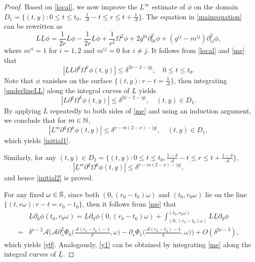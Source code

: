 \documentclass[10pt,a4paper]{amsart}
\begin{document}
\begin{proof}
Based on \eqref{local}, we now improve the $L^\infty$ estimate of $\phi$ on the domain $D_1=\{(t,y): 0\le t \le t_0,$
$\frac{1}{\mathcal A} - t\le r \le t+\frac{ 1}{\mathcal A}\}$.
The equation in \eqref{mainequation} can be rewritten as
\begin{equation}\label{me}
L\underline{L}\phi
= \frac{1}{2r}L\phi
- \frac{1}{2r}\underline{L}\phi
+ \frac{1}{r^2}\Omega^2\phi
+ 2g^{0i}\partial_{0i}^2\phi
+ (g^{ij}-m^{ij})\partial_{ij}^2\phi,
\end{equation}
where $m^{ii} = 1$ for $i=1, 2$ and $m^{ij} = 0$ for $i\neq j$.
It follows from \eqref{local} and \eqref{me} that
\begin{equation}\label{underlineLL}
|\underline{L}L\partial^q\Omega^k\phi(t,y)|
\le \delta^{2\nu-3-|q|},
\quad 0 \le t \le t_0.
\end{equation}
Note that $\phi$ vanishes on the surface $\{(t,y) : r- t = \frac{1}{\mathcal A}\}$, then integrating \eqref{underlineLL} along
the integral curves of $\underline{L}$ yields
\begin{equation}\label{YHCC4}
|L\partial^q\Omega^k\phi(t,y)|
\le \delta^{2\nu-2-|q|},
\quad (t,y) \in D_1.
\end{equation}
By applying $L$ repeatedly to both sides of \eqref{me} and using an induction argument,
we conclude that for $m\in\Bbb N$,
\[
|L^m\partial^q\Omega^k\phi(t,y)|
\le \delta^{\nu-m(2-\nu)-|q|},
\quad (t,y) \in D_1,
\]
which yields \eqref{initial1}.


Similarly, for any $(t,y) \in D_2=\{(t,y): 0\le t \le t_0,
\frac{1-\delta}{\mathcal A} - t \le r \le t+\frac{ 1-\delta}{\mathcal A}\}$,
\[
|\underline L^m\partial^q\Omega^k\phi(t,y)|
\le \delta^{\nu-m(2-\nu)-|q|},
\]
and hence \eqref{initial2} is proved.

For any fixed $\omega\in\Bbb S$, since both $(0,(r_0-t_0)\omega)$ and $(t_0, r_0\omega)$ lie on the line $\{(t,r\omega): r-t=r_0-t_0\}$,
then it follows from \eqref{me} that
\begin{equation}\label{YHCCC-3}
\begin{split}
&\underline{L}\partial_{0}\phi(t_0,r_0\omega)
=\underline{L}\partial_{0}\phi(0,(r_0-t_0)\omega)+\int_{(0,(r_0-t_0)\omega)}^{(t_0,r_0\omega)}L\underline{L}\partial_{0}\phi\\
=&\delta^{\nu-2}\mathcal{A}\big(\mathcal{A}\partial_s^2\Phi_0\big(\frac{\mathcal{A}(r_0-t_0)-1}{\delta}, \omega\big)-\partial_s\Phi_1\big(\frac{\mathcal{A}(r_0-t_0)-1}{\delta}, \omega\big)\big)+O(\delta^{2\nu-3}),
\end{split}
\end{equation}
which yields \eqref{y0}. Analogously, \eqref{y1} can be obtained
by integrating \eqref{me} along the integral curves of $\underline L$.
\end{proof}
\end{document}
